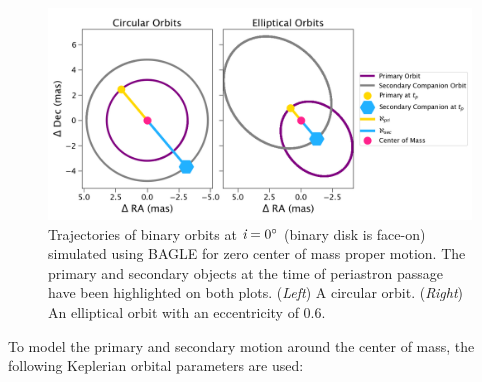 \documentclass[twocolumn]{aastex701}
\newcommand{\tnot}{t_{0,\sun}}
\newcommand{\inclination}{\textit{i}}
\begin{document}
\begin{figure}
    \centering
    \includegraphics[width=\textwidth]{figures/com_motion.png}
    \caption{Trajectories of binary orbits at $\inclination = 0 \degree$ (binary disk is face-on) simulated using BAGLE for zero center of mass proper motion. The primary and secondary objects at the time of periastron passage have been highlighted on both plots. (\emph{Left}) A circular orbit. (\emph{Right}) An elliptical orbit with an eccentricity of $0.6$. }
    \label{fig:com_geometry}
\end{figure}

To model the primary and secondary motion around the center of mass, the following Keplerian orbital parameters are used: 


\end{document}
